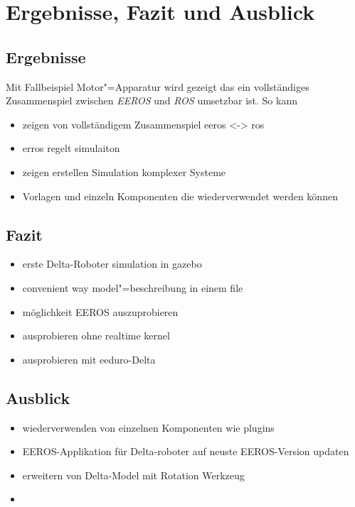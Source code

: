\chapter{Ergebnisse, Fazit und Ausblick}

\section{Ergebnisse}
Mit Fallbeispiel Motor"=Apparatur wird gezeigt das ein vollständiges Zusammenspiel zwischen \textit{EEROS} und \textit{ROS} umsetzbar ist.
So kann 


\begin{itemize}
\item zeigen von vollständigem Zusammenspiel eeros <-> ros
\item erros regelt simulaiton
\item zeigen erstellen Simulation komplexer Systeme
\item Vorlagen und einzeln Komponenten die wiederverwendet werden können
\end{itemize}

\section{Fazit}
\begin{itemize}
\item erste Delta-Roboter simulation in gazebo
\item convenient way model"=beschreibung in einem file
\item möglichkeit EEROS auszuprobieren
\item ausprobieren ohne realtime kernel
\item ausprobieren mit eeduro-Delta
\end{itemize}

\section{Ausblick}
\begin{itemize}
\item wiederverwenden von einzelnen Komponenten wie plugins
\item EEROS-Applikation für Delta-roboter auf neuste EEROS-Version updaten
\item erweitern von Delta-Model mit Rotation Werkzeug
\item 
\end{itemize}